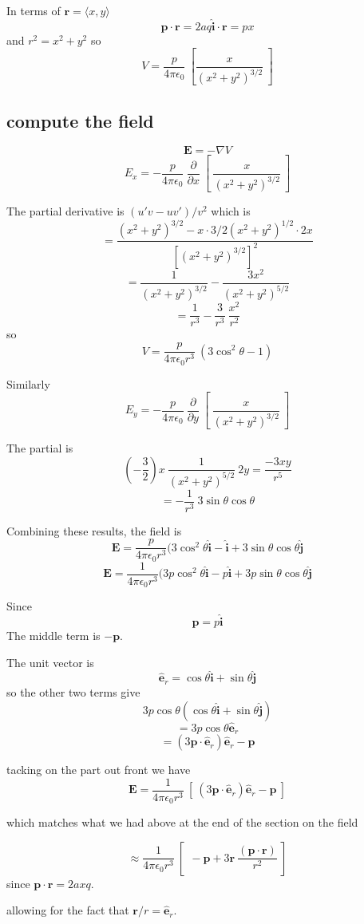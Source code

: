 \documentclass[11pt, oneside]{article}
\begin{document}
In terms of $\mathbf{r} = \langle x, y \rangle$
\[ \mathbf{p} \cdot \mathbf{r} = 2 a q \mathbf{\hat{i}} \cdot \mathbf{r} = px \]
and $r^2 = x^2 + y^2$ so
\[ V = \frac{p}{4 \pi \epsilon_0} \ [ \frac{x}{(x^2 + y^2)^{3/2}}  \ ] \]

\subsection*{compute the field}

\[ \mathbf{E} = - \nabla V \]
\[ E_x =  - \frac{p}{4 \pi \epsilon_0} \ \frac{\partial}{\partial x} \ [ \ \frac{x}{(x^2 + y^2)^{3/2}}  \ ] \]

The partial derivative is $(u'v - uv')/v^2$ which is
\[ = \frac{(x^2 + y^2)^{3/2} - x \cdot 3/2 (x^2 + y^2)^{1/2} \cdot 2x}{[(x^2  + y^2)^{3/2}]^2} \]
\[ = \frac{1}{(x^2 + y^2)^{3/2}} - \frac{3x^2}{(x^2+y^2)^{5/2}} \]
\[ = \frac{1}{r^3} - \frac{3}{r^3} \ \frac{x^2}{r^2} \]
so
\[ V = \frac{p}{4 \pi \epsilon_0 r^3} \ (3 \cos^2 \theta - 1 ) \]

Similarly
\[ E_y =  - \frac{p}{4 \pi \epsilon_0} \ \frac{\partial}{\partial y} \ [ \ \frac{x}{(x^2 + y^2)^{3/2}}  \ ] \]

The partial is
\[ (- \frac{3}{2}) x \ \frac{1}{(x^2 + y^2)^{5/2}} \ 2y = \frac{-3xy}{r^5} \]
\[ = - \frac{1}{r^3} \ 3 \sin \theta \cos \theta \]

Combining these results, the field is
\[ \mathbf{E} = \frac{p}{4 \pi \epsilon_0 r^3} (3 \cos^2 \theta \mathbf{\hat{i}} -  \mathbf{\hat{i}} + 3 \sin \theta \cos \theta  \mathbf{\hat{j}} \]
\[ \mathbf{E} = \frac{1}{4 \pi \epsilon_0 r^3} (3p \cos^2 \theta \mathbf{\hat{i}} -  p\mathbf{\hat{i}} + 3p \sin \theta \cos \theta  \mathbf{\hat{j}} \]

Since 
\[ \mathbf{p} = p  \mathbf{\hat{i}} \]
The middle term is $- \mathbf{p}$. 

The unit vector is
\[  \mathbf{\hat{e}}_r = \cos \theta  \mathbf{\hat{i}} + \sin \theta  \mathbf{\hat{j}} \]
so the other two terms give
\[ 3p \cos \theta ( \cos \theta \mathbf{\hat{i}} + \sin \theta \mathbf{\hat{j}}) \]
\[ = 3p \cos \theta \mathbf{\hat{e}}_r \]
\[ = (3 \mathbf{p} \cdot \mathbf{\hat{e}}_r) \mathbf{\hat{e}}_r - \mathbf{p} \]

tacking on the part out front we have
\[ \mathbf{E} =  \frac{1}{4 \pi \epsilon_0 r^3} \ [ \ (3 \mathbf{p} \cdot \mathbf{\hat{e}}_r) \mathbf{\hat{e}}_r - \mathbf{p} \ ] \]

which matches what we had above at the end of the section on the field

\[ \approx \frac{1}{4 \pi \epsilon_0 r^3} \ [ \  \ - \mathbf{p} + 3 \mathbf{r} \ \frac{(\mathbf{p} \cdot \mathbf{r} )}{r^2} \ ] \]
since $\mathbf{p} \cdot \mathbf{r} = 2axq$.

allowing for the fact that $\mathbf{r}/r = \mathbf{\hat{e}}_r$.
\end{document}
